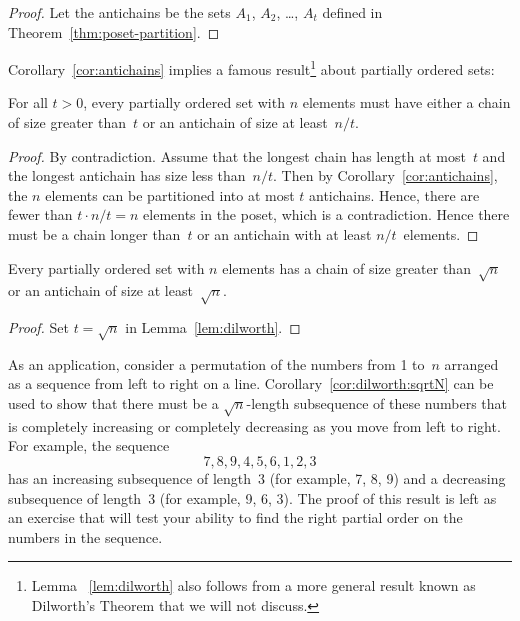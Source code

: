 \begin{proof}
Let the antichains be the sets $A_1$, $A_2$, \dots, $A_t$ defined in
Theorem~\ref{thm:poset-partition}.
\end{proof}

Corollary~\ref{cor:antichains} implies a famous result\footnote{Lemma
  ~\ref{lem:dilworth} also follows from a more general result known as
  Dilworth's Theorem that we will not discuss.} about partially
ordered sets:

\begin{lemma}[Dilworth]\label{lem:dilworth}
For all $t > 0$, every partially ordered set with $n$ elements must
have either a chain of size greater than~$t$ or an antichain of size
at least~$n/t$.
\end{lemma}

\begin{proof}
By contradiction.  Assume that the longest chain has length at
most~$t$ and the longest antichain has size less than~$n/t$.  Then by
Corollary~\ref{cor:antichains}, the $n$ elements can be partitioned
into at most $t$ antichains.  Hence, there are fewer than $t \cdot n/t
= n$ elements in the poset, which is a contradiction.  Hence there
must be a chain longer than~$t$ or an antichain with at least
$n/t$~elements.
\end{proof}

\begin{corollary}\label{cor:dilworth:sqrtN}
Every partially ordered set with $n$ elements has a chain of size
greater than~$\sqrt{n}$ or an antichain of size at least~$\sqrt{n}$.
\end{corollary}

\begin{proof}
Set $t = \sqrt{n}$ in Lemma~\ref{lem:dilworth}.
\end{proof}

As an application, consider a permutation of the numbers from 1 to~$n$
arranged as a sequence from left to right on a line.
Corollary~\ref{cor:dilworth:sqrtN} can be used to show that there must
be a $\sqrt{n}$-length subsequence of these numbers that is completely
increasing or completely decreasing as you move from left to right.
For example, the sequence
\begin{equation*}
    7, 8, 9, 4, 5, 6, 1, 2, 3
\end{equation*}
has an increasing subsequence of length~3 (for example, 7, 8, 9) and a
decreasing subsequence of length~3 (for example, 9, 6, 3).  The proof
of this result is left as an exercise that will test your ability to
find the right partial order on the numbers in the sequence.

\problemsection

\endinput

